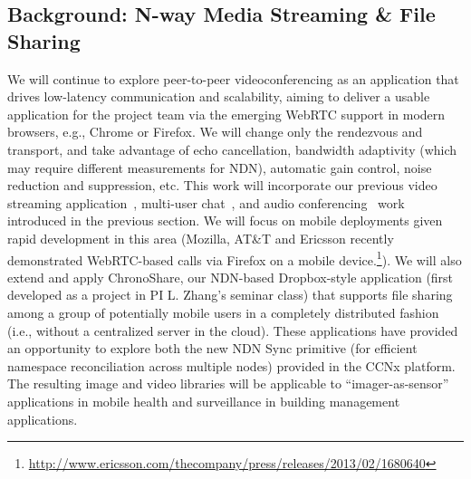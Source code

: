 \subsection{Background: N-way Media Streaming \& File Sharing}
We will continue to explore peer-to-peer videoconferencing as an application
that drives low-latency communication and scalability, aiming to deliver
a usable application for the project team via the emerging WebRTC support
in modern browsers, e.g., Chrome or Firefox.   We will change only the
rendezvous and transport, and take advantage of echo cancellation,
bandwidth adaptivity (which may require different measurements for NDN),
automatic gain control, noise reduction and suppression, etc.  This work
will incorporate our previous video streaming application~\cite{videoTR}, 
multi-user chat~\cite{ChronosTR},  and audio conferencing~\cite{act-sec} work introduced in the previous section.  
We will focus on mobile deployments given rapid development in this area 
(Mozilla, AT\&T and Ericsson recently demonstrated WebRTC-based calls
via Firefox on a mobile
device.\footnote{\url{http://www.ericsson.com/thecompany/press/releases/2013/02/1680640}}).
We will also extend and apply ChronoShare, our NDN-based Dropbox-style
application (first developed as a project in PI L. Zhang's seminar class) that 
supports file sharing among a group of potentially mobile users in a 
completely distributed fashion (i.e., without a centralized
server in the cloud).  These applications have provided an opportunity to explore 
both the new NDN Sync primitive (for efficient namespace reconciliation 
across multiple nodes) provided in the CCNx platform. The resulting image and video libraries will be applicable to ``imager-as-sensor'' applications in mobile health and surveillance in building management applications. 



